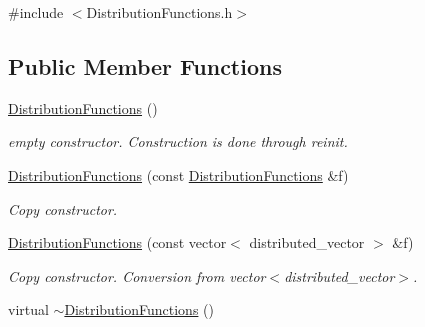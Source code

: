 {\ttfamily \#include $<$DistributionFunctions.h$>$}\subsection*{Public Member Functions}
\begin{DoxyCompactItemize}
\item 
\hypertarget{classnatrium_1_1DistributionFunctions_a4fc9c42637465355a9df7681d45340c9}{
\hyperlink{classnatrium_1_1DistributionFunctions_a4fc9c42637465355a9df7681d45340c9}{DistributionFunctions} ()}
\label{classnatrium_1_1DistributionFunctions_a4fc9c42637465355a9df7681d45340c9}

\begin{DoxyCompactList}\small\item\em empty constructor. Construction is done through reinit. \item\end{DoxyCompactList}\item 
\hypertarget{classnatrium_1_1DistributionFunctions_af0a970355419acf79be898e573f3149a}{
\hyperlink{classnatrium_1_1DistributionFunctions_af0a970355419acf79be898e573f3149a}{DistributionFunctions} (const \hyperlink{classnatrium_1_1DistributionFunctions}{DistributionFunctions} \&f)}
\label{classnatrium_1_1DistributionFunctions_af0a970355419acf79be898e573f3149a}

\begin{DoxyCompactList}\small\item\em Copy constructor. \item\end{DoxyCompactList}\item 
\hypertarget{classnatrium_1_1DistributionFunctions_a0ea3ad0426df18a986578f7b57361dd3}{
\hyperlink{classnatrium_1_1DistributionFunctions_a0ea3ad0426df18a986578f7b57361dd3}{DistributionFunctions} (const vector$<$ distributed\_\-vector $>$ \&f)}
\label{classnatrium_1_1DistributionFunctions_a0ea3ad0426df18a986578f7b57361dd3}

\begin{DoxyCompactList}\small\item\em Copy constructor. Conversion from vector$<$distributed\_\-vector$>$. \item\end{DoxyCompactList}\item 
\hypertarget{classnatrium_1_1DistributionFunctions_af965a46fbf124e8f90250c843e615bcd}{
virtual \hyperlink{classnatrium_1_1DistributionFunctions_af965a46fbf124e8f90250c843e615bcd}{$\sim$DistributionFunctions} ()}
\label{classnatrium_1_1DistributionFunctions_af965a46fbf124e8f90250c843e615bcd}


\end{DoxyCompactItemize}
